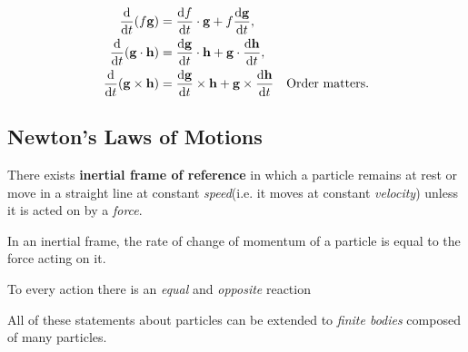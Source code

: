 \begin{proposition}\label{prop:product rules}
\begin{align*}
    \frac{\mathrm{d}}{\mathrm{d}t}(f{\bf g}) &= \frac{\mathrm{d}f}{\mathrm{d}t} \cdot {\bf g} + f \frac{\mathrm{d}{\bf g}}{\mathrm{d}t},\\
    \frac{\mathrm{d}}{\mathrm{d}t}({\bf g} \cdot {\bf h}) &= \frac{\mathrm{d}{\bf g}}{\mathrm{d}t} \cdot {\bf h} + {\bf g} \cdot \frac{\mathrm{d}{\bf h}}{\mathrm{d}t},\\ 
    \frac{\mathrm{d}}{\mathrm{d}t}({\bf g} \times {\bf h}) &= \frac{\mathrm{d}{\bf g}}{\mathrm{d}t} \times {\bf h} + {\bf g} \times \frac{\mathrm{d}{\bf h}}{\mathrm{d}t}\quad\text{Order matters}.\\
\end{align*}
\end{proposition}
\subsection{Newton's Laws of Motions}
\begin{law}
    There exists \textbf{inertial frame of reference} in which a particle remains at rest or move in a straight line at constant \textit{speed}(i.e. it moves at constant \textit{velocity}) unless it is acted on by a \textit{force}.
\end{law}
\begin{law}
    In an inertial frame, the rate of change of momentum of a particle is equal to the force acting on it.
\end{law}
\begin{law}
    To every action there is an \textit{equal} and \textit{opposite} reaction
\end{law}
\begin{note}
    All of these statements about particles can be extended to \textit{finite bodies} composed of many particles.
\end{note}